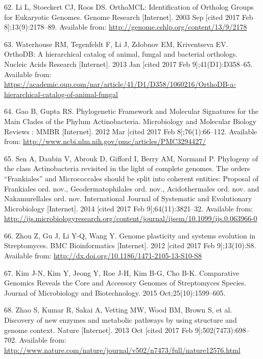 \documentclass[12pt,twoside]{reedthesis}
\begin{document}
  \hypertarget{ref-li_orthomcl_2003}{}
  62. Li L, Stoeckert CJ, Roos DS. OrthoMCL: Identification of Ortholog
  Groups for Eukaryotic Genomes. Genome Research {[}Internet{]}. 2003 Sep
  {[}cited 2017 Feb 8{]};13(9):2178--89. Available from:
  \url{http://genome.cshlp.org/content/13/9/2178}
  
  \hypertarget{ref-waterhouse_orthodb_2013}{}
  63. Waterhouse RM, Tegenfeldt F, Li J, Zdobnov EM, Kriventseva EV.
  OrthoDB: A hierarchical catalog of animal, fungal and bacterial
  orthologs. Nucleic Acids Research {[}Internet{]}. 2013 Jan {[}cited 2017
  Feb 9{]};41(D1):D358--65. Available from:
  \url{https://academic.oup.com/nar/article/41/D1/D358/1060216/OrthoDB-a-hierarchical-catalog-of-animal-fungal}
  
  \hypertarget{ref-gao_phylogenetic_2012}{}
  64. Gao B, Gupta RS. Phylogenetic Framework and Molecular Signatures for
  the Main Clades of the Phylum Actinobacteria. Microbiology and Molecular
  Biology Reviews : MMBR {[}Internet{]}. 2012 Mar {[}cited 2017 Feb
  8{]};76(1):66--112. Available from:
  \url{http://www.ncbi.nlm.nih.gov/pmc/articles/PMC3294427/}
  
  \hypertarget{ref-sen_phylogeny_2014}{}
  65. Sen A, Daubin V, Abrouk D, Gifford I, Berry AM, Normand P. Phylogeny
  of the class Actinobacteria revisited in the light of complete genomes.
  The orders ``Frankiales'' and Micrococcales should be split into
  coherent entities: Proposal of Frankiales ord. nov., Geodermatophilales
  ord. nov., Acidothermales ord. nov. and Nakamurellales ord. nov.
  International Journal of Systematic and Evolutionary Microbiology
  {[}Internet{]}. 2014 {[}cited 2017 Feb 9{]};64(11):3821--32. Available
  from:
  \url{http://ijs.microbiologyresearch.org/content/journal/ijsem/10.1099/ijs.0.063966-0}
  
  \hypertarget{ref-zhou_genome_2012}{}
  66. Zhou Z, Gu J, Li Y-Q, Wang Y. Genome plasticity and systems
  evolution in Streptomyces. BMC Bioinformatics {[}Internet{]}. 2012
  {[}cited 2017 Feb 9{]};13(10):S8. Available from:
  \url{http://dx.doi.org/10.1186/1471-2105-13-S10-S8}
  
  \hypertarget{ref-kim_comparative_2015}{}
  67. Kim J-N, Kim Y, Jeong Y, Roe J-H, Kim B-G, Cho B-K. Comparative
  Genomics Reveals the Core and Accessory Genomes of Streptomyces Species.
  Journal of Microbiology and Biotechnology. 2015 Oct;25(10):1599--605.
  
  \hypertarget{ref-zhao_discovery_2013}{}
  68. Zhao S, Kumar R, Sakai A, Vetting MW, Wood BM, Brown S, et al.
  Discovery of new enzymes and metabolic pathways by using structure and
  genome context. Nature {[}Internet{]}. 2013 Oct {[}cited 2017 Feb
  9{]};502(7473):698--702. Available from:
  \url{http://www.nature.com/nature/journal/v502/n7473/full/nature12576.html}
  
\end{document}
